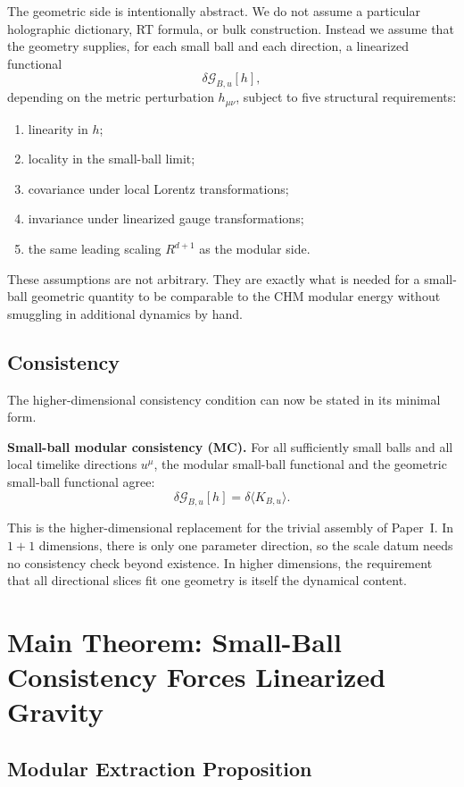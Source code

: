 \documentclass[12pt]{article}
\theoremstyle{definition}
\theoremstyle{remark}
\begin{document}
The geometric side is intentionally abstract. We do not assume a particular holographic dictionary, RT formula\cite{RyuTakayanagi2006}, or bulk construction. Instead we assume that the geometry supplies, for each small ball and each direction, a linearized functional
\[
\delta\mathcal{G}_{B,u}[h],
\]
depending on the metric perturbation \(h_{\mu\nu}\), subject to five structural requirements:
\begin{enumerate}
\item linearity in \(h\);
\item locality in the small-ball limit;
\item covariance under local Lorentz transformations;
\item invariance under linearized gauge transformations;
\item the same leading scaling \(R^{d+1}\) as the modular side.
\end{enumerate}
These assumptions are not arbitrary. They are exactly what is needed for a small-ball geometric quantity to be comparable to the CHM modular energy without smuggling in additional dynamics by hand.

\subsection{Consistency}\label{subsec:3.4}

The higher-dimensional consistency condition can now be stated in its minimal form.

\textbf{Small-ball modular consistency (MC).}
For all sufficiently small balls and all local timelike directions \(u^\mu\), the modular small-ball functional and the geometric small-ball functional agree:
\[
\delta\mathcal{G}_{B,u}[h]
=
\delta\langle K_{B,u}\rangle.
\]

This is the higher-dimensional replacement for the trivial assembly of Paper~I\cite{PaperI}. In \(1+1\) dimensions, there is only one parameter direction, so the scale datum needs no consistency check beyond existence. In higher dimensions, the requirement that all directional slices fit one geometry is itself the dynamical content.

\section{Main Theorem: Small-Ball Consistency Forces Linearized Gravity}\label{sec:4}

\subsection{Modular Extraction Proposition}\label{subsec:4.1}
\end{document}
